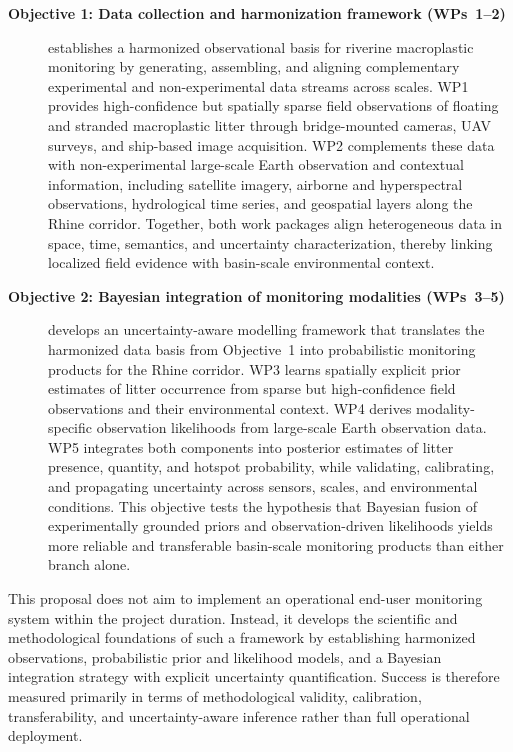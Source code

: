 \documentclass{scrartcl}
\begin{document}
\begin{description}
    \item[\textbf{Objective 1: Data collection and harmonization framework (WPs~1--2)}] establishes a harmonized observational basis for riverine macroplastic monitoring by generating, assembling, and aligning complementary experimental and non-experimental data streams across scales. WP1 provides high-confidence but spatially sparse field observations of floating and stranded macroplastic litter through bridge-mounted cameras, UAV surveys, and ship-based image acquisition. WP2 complements these data with non-experimental large-scale Earth observation and contextual information, including satellite imagery, airborne and hyperspectral observations, hydrological time series, and geospatial layers along the Rhine corridor. Together, both work packages align heterogeneous data in space, time, semantics, and uncertainty characterization, thereby linking localized field evidence with basin-scale environmental context.

    \item[\textbf{Objective 2: Bayesian integration of monitoring modalities (WPs~3--5)}] develops an uncertainty-aware modelling framework that translates the harmonized data basis from Objective~1 into probabilistic monitoring products for the Rhine corridor. WP3 learns spatially explicit prior estimates of litter occurrence from sparse but high-confidence field observations and their environmental context. WP4 derives modality-specific observation likelihoods from large-scale Earth observation data. WP5 integrates both components into posterior estimates of litter presence, quantity, and hotspot probability, while validating, calibrating, and propagating uncertainty across sensors, scales, and environmental conditions. This objective tests the hypothesis that Bayesian fusion of experimentally grounded priors and observation-driven likelihoods yields more reliable and transferable basin-scale monitoring products than either branch alone.
\end{description}

This proposal does not aim to implement an operational end-user monitoring system within the project duration. Instead, it develops the scientific and methodological foundations of such a framework by establishing harmonized observations, probabilistic prior and likelihood models, and a Bayesian integration strategy with explicit uncertainty quantification. Success is therefore measured primarily in terms of methodological validity, calibration, transferability, and uncertainty-aware inference rather than full operational deployment.
\end{document}
